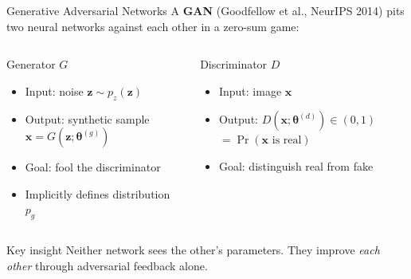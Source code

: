 \documentclass[aspectratio=169,11pt]{beamer}
\newcommand{\bx}{\bm{x}}
\newcommand{\bz}{\bm{z}}
\newcommand{\btheta}{\bm{\theta}}
\newcommand{\pg}{p_{g}}           %
\newcommand{\pz}{p_{z}}           %
\begin{document}
\begin{frame}{Generative Adversarial Networks}
  A \textbf{GAN} (Goodfellow et al., NeurIPS 2014) pits two neural
  networks against each other in a zero-sum game:

  \medskip
  \begin{columns}[T]
      \begin{block}{Generator $G$}
        \begin{itemize}
          \item Input: noise $\bz\sim\pz(\bz)$
          \item Output: synthetic sample
                $\bx = G(\bz;\btheta^{(g)})$
          \item Goal: fool the discriminator
          \item Implicitly defines distribution $\pg$
        \end{itemize}
      \end{block}
      \begin{block}{Discriminator $D$}
        \begin{itemize}
          \item Input: image $\bx$
          \item Output: $D(\bx;\btheta^{(d)})\in(0,1)$
            $=\Pr(\bx\text{ is real})$
          \item Goal: distinguish real from fake
        \end{itemize}
      \end{block}
  \end{columns}

  \bigskip
  \begin{alertblock}{Key insight}
    Neither network sees the other's parameters.
    They improve \emph{each other} through adversarial feedback alone.
  \end{alertblock}
\end{frame}
\end{document}
